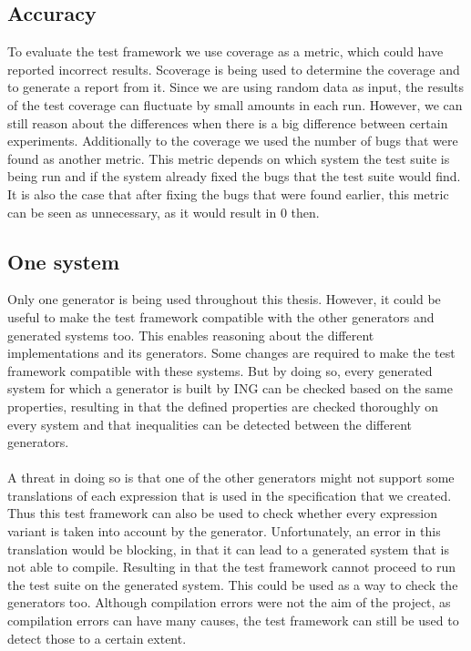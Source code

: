 \subsection*{Accuracy}
To evaluate the test framework we use coverage as a metric, which could have reported incorrect results. Scoverage is being used to determine the coverage and to generate a report from it. Since we are using random data as input, the results of the test coverage can fluctuate by small amounts in each run. However, we can still reason about the differences when there is a big difference between certain experiments. Additionally to the coverage we used the number of bugs that were found as another metric. This metric depends on which system the test suite is being run and if the system already fixed the bugs that the test suite would find. It is also the case that after fixing the bugs that were found earlier, this metric can be seen as unnecessary, as it would result in 0 then.

\subsection*{One system}
Only one generator is being used throughout this thesis. However, it could be useful to make the test framework compatible with the other generators and generated systems too. This enables reasoning about the different implementations and its generators. Some changes are required to make the test framework compatible with these systems. But by doing so, every generated system for which a generator is built by ING can be checked based on the same properties, resulting in that the defined properties are checked thoroughly on every system and that inequalities can be detected between the different generators.\\
\\
A threat in doing so is that one of the other generators might not support some translations of each expression that is used in the specification that we created. Thus this test framework can also be used to check whether every expression variant is taken into account by the generator. Unfortunately, an error in this translation would be blocking, in that it can lead to a generated system that is not able to compile. Resulting in that the test framework cannot proceed to run the test suite on the generated system. This could be used as a way to check the generators too. Although compilation errors were not the aim of the project, as compilation errors can have many causes, the test framework can still be used to detect those to a certain extent.

